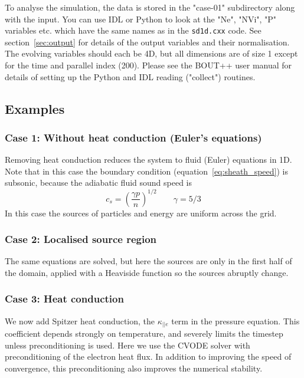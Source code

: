 \documentclass[12pt,a4paper]{article}
\begin{document}
To analyse the simulation, the data is stored in the "case-01" subdirectory along with the input. You can use IDL or Python to look at the "Ne", "NVi", "P" variables etc. which have the same names as in the \texttt{sd1d.cxx} code. See section~\ref{sec:output} for
details of the output variables and their normalisation. The evolving variables should each be 4D, but all dimensions are of size 1 except for the time and parallel index (200). Please see the BOUT++ user manual for details of setting up the Python and IDL reading ("collect") routines. 


\subsection{Examples}

\subsubsection{Case 1: Without heat conduction (Euler's equations)}

Removing heat conduction reduces the system to fluid (Euler) equations in 1D.
Note that in this case the boundary condition (equation~\ref{eq:sheath_speed}) is subsonic, because
the adiabatic fluid sound speed is
\[
c_s = \left( \frac{\gamma p}{n}\right)^{1/2} \qquad \gamma = 5/3
\]
In this case the sources of particles and energy are uniform across the grid.

\subsubsection{Case 2: Localised source region}

The same equations are solved, but here the sources are only in the first half of the domain, 
applied with a Heaviside function so the sources abruptly change.

\subsubsection{Case 3: Heat conduction}

We now add Spitzer heat conduction, the $\kappa_{||e}$ term in the pressure equation. This coefficient depends strongly on temperature, and severely limits the timestep unless preconditioning is used. Here we use the CVODE solver with preconditioning of the electron heat flux. In addition to improving
the speed of convergence, this preconditioning also improves the numerical stability.
\end{document}
